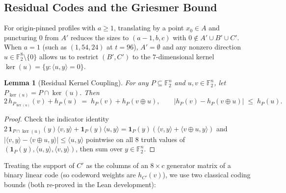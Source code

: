\documentclass[11pt]{article}
\newtheorem{lemma}[theorem]{Lemma}
\theoremstyle{definition}
\newcommand{\F}{\mathbb{F}}
\newcommand{\ind}{\mathbf{1}}
\begin{document}
\subsection{Residual Codes and the Griesmer Bound}
\label{sec:coding}

For origin-pinned profiles with $a \ge 1$, translating by a point $x_0 \in A$ and puncturing $0$ from $A'$ reduces the sizes to $(a-1, b, c)$ with $0 \notin A' \cup B' \cup C'$.
When $a = 1$ (such as $(1, 54, 24)$ at $t = 96$), $A' = \emptyset$ and any nonzero direction $u \in \F_2^8 \setminus \{0\}$ allows us to restrict $(B', C')$ to the $7$-dimensional kernel $\ker(u) = \{y : \langle u, y \rangle = 0\}$.

\begin{lemma}[Residual Kernel Coupling]
\label{lem:residual}
For any $P \subseteq \F_2^n$ and $u, v \in \F_2^n$, let $P_{\ker(u)} = P \cap \ker(u)$. Then
\[
  2\, h_{P_{\ker(u)}}(v) + h_P(u) \;=\; h_P(v) + h_P(v \oplus u),
  \qquad
  \bigl|h_P(v) - h_P(v \oplus u)\bigr| \;\le\; h_P(u).
\]
\end{lemma}
\begin{proof}
Check the indicator identity $2\,\ind_{P \cap \ker(u)}(y)\langle v, y \rangle + \ind_P(y)\langle u, y \rangle = \ind_P(y)(\langle v, y\rangle + \langle v \oplus u, y\rangle)$ and $|\langle v, y \rangle - \langle v \oplus u, y\rangle| \le \langle u, y \rangle$ pointwise on all $8$ truth values of $(\ind_P(y), \langle u, y\rangle, \langle v, y\rangle)$, then sum over $y \in \F_2^n$.
\end{proof}

Treating the support of $C'$ as the columns of an $8 \times c$ generator matrix of a binary linear code (so codeword weights are $h_{C'}(v)$), we use two classical coding bounds (both re-proved in the Lean development):
\end{document}
